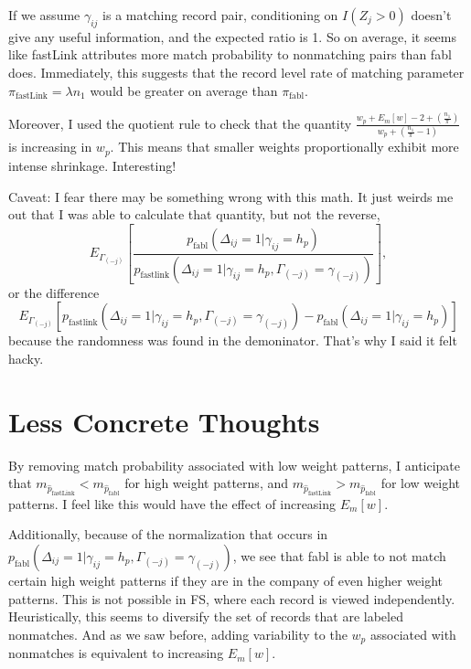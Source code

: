 \documentclass[12pt,letterpaper]{article}
\newcommand{\1}[1]{\mathbb{I}\!\left[#1\right]} %
\begin{document}
If we assume $\gamma_{ij}$ is a matching record pair, conditioning on $I(Z_j>0)$ doesn't give any useful information, and the expected ratio is 1. So on average, it seems like fastLink attributes more match probability to nonmatching pairs than fabl does. Immediately, this suggests that the record level rate of matching parameter $\pi_{\text{fastLink}}= \lambda n_1$ would be greater on average than $\pi_{\text{fabl}}$. 

Moreover, I used the quotient rule to check that the quantity $\frac{w_p  + E_m[w] - 2 + (\frac{n_1}{\pi})}{w_p + (\frac{n_1}{\pi} - 1)}$ is increasing in $w_p$. This means that smaller weights proportionally exhibit more intense shrinkage. Interesting!

Caveat: I fear there may be something wrong with this math. It just weirds me out that I was able to calculate that quantity, but not the reverse, 
$$E_{\Gamma_{(-j)}} \left[\frac{p_{\text{fabl}}(\Delta_{ij} = 1| \gamma_{ij} = h_p)}{p_{\text{fastlink}}(\Delta_{ij} = 1| \gamma_{ij} = h_p, \Gamma_{(-j)} = \gamma_{(-j)})}\right],$$ 
or the difference $$E_{\Gamma_{(-j)}}\left[p_{\text{fastlink}}(\Delta_{ij} = 1| \gamma_{ij} = h_p, \Gamma_{(-j)} = \gamma_{(-j)}) - p_{\text{fabl}}(\Delta_{ij} = 1| \gamma_{ij} = h_p)\right]$$ because the randomness was found in the demoninator. That's why I said it felt hacky. 

\section{Less Concrete Thoughts}

By removing match probability associated with low weight patterns, I anticipate that $m_{\hat{p}_{\text{fastLink}}} < m_{\hat{p}_{\text{fabl}}}$ for high weight patterns, and $m_{\hat{p}_{\text{fastLink}}} > m_{\hat{p}_{\text{fabl}}}$ for low weight patterns. I feel like this would have the effect of increasing $E_m[w]$.

Additionally, because of the normalization that occurs in $p_{\text{fabl}}(\Delta_{ij} = 1| \gamma_{ij} = h_p, \Gamma_{(-j)} = \gamma_{(-j)})$, we see that fabl is able to not match certain high weight patterns if they are in the company of even higher weight patterns. This is not possible in FS, where each record is viewed independently. Heuristically, this seems to diversify the set of records that are labeled nonmatches. And as we saw before, adding variability to the $w_p$ associated with nonmatches is equivalent to increasing $E_m[w]$. 
\end{document}
